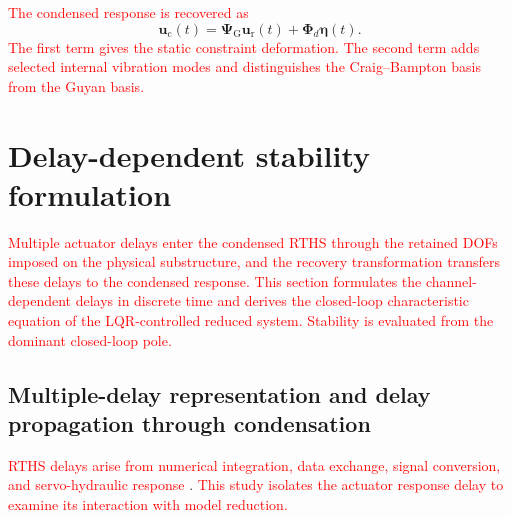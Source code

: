 \documentclass[11pt,a4paper]{article}
\numberwithin{equation}{section}
\newcommand{\rev}[1]{\textcolor{red}{#1}}
\begin{document}
\rev{The condensed response is recovered as}
\begin{equation}
	\bm{u}_{\mathrm{c}}(t)=
	\bm{\Psi}_{\mathrm{G}}\bm{u}_{\mathrm{r}}(t)
	+\bm{\Phi}_{d}\bm{\eta}(t).
	\label{eq:cb-internal-recovery}
\end{equation}
\rev{The first term gives the static constraint deformation. The second term adds selected internal vibration modes and distinguishes the Craig--Bampton basis from the Guyan basis.}


\section{Delay-dependent stability formulation} \label{sec3}

\rev{Multiple actuator delays enter the condensed RTHS through the retained DOFs imposed on the physical substructure, and the recovery transformation transfers these delays to the condensed response. This section formulates the channel-dependent delays in discrete time and derives the closed-loop characteristic equation of the LQR-controlled reduced system. Stability is evaluated from the dominant closed-loop pole.}

\subsection{Multiple-delay representation and delay propagation through condensation}
\label{sec:multiple-delay}

\rev{RTHS delays arise from numerical integration, data exchange, signal conversion, and servo-hydraulic response} \cite{Carrion2007}. \rev{This study isolates the actuator response delay to examine its interaction with model reduction.}
\end{document}
